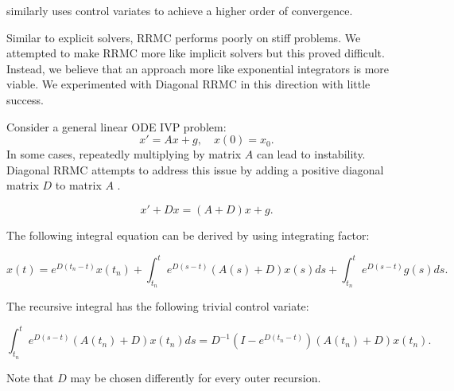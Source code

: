 \documentclass[a4paper,12pt]{article}
\begin{document}
\begin{related}[CV RRMC]
    \cite{daun_randomized_2011} similarly uses control variates to achieve
    a higher order of convergence.
\end{related}

Similar to explicit solvers, RRMC performs poorly on stiff problems.
We attempted to make RRMC more like implicit solvers but this proved difficult.
Instead, we believe that an approach more like exponential integrators
is more viable. We experimented with Diagonal RRMC in this direction with
little success.

\begin{definition} \label{def:DRRMC}
    Consider a general linear ODE IVP problem:
    \begin{equation}
        x' = Ax+g, \quad x(0)= x_{0}.
    \end{equation}
    In some cases, repeatedly multiplying by matrix $A$ can lead to instability.
    Diagonal RRMC attempts to address this issue by adding a positive diagonal matrix $D$
    to matrix $A$ .

    \begin{equation}
        x' + Dx = (A+D)x+g.
    \end{equation}

    The following integral equation can be derived by using integrating factor:

    \begin{equation}\label{eq:int eq DRRMC}
        x(t)= e^{D(t_{n}-t)}x(t_{n}) + \int_{t_{n}}^{t} e^{D(s-t)}(A(s)+D)x(s)ds+\int_{t_{n}}^{t} e^{D(s-t)}g(s)ds.
    \end{equation}

    The recursive integral has the following trivial control variate:

    \begin{equation}\label{eq: CV DRRMC}
        \int_{t_{n}}^{t}  e^{D(s-t)}(A(t_{n})+D)x(t_{n})ds = D^{-1}(I-e^{D(t_{n}-t)})(A(t_{n})+D)x(t_{n}).
    \end{equation}

    Note that $D$ may be chosen differently for every outer recursion.
\end{definition}
\end{document}
